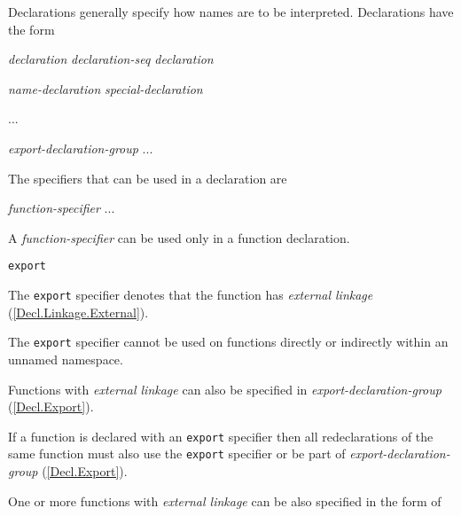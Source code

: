 \p Declarations generally specify how names are to be interpreted. Declarations have the form
\begin{grammar}
  \br
  \textit{declaration}\br
  \textit{declaration-seq declaration}

  \br
  \textit{name-declaration}\br
  \textit{special-declaration}
  
  \br
  ...

  \br
  \textit{export-declaration-group}\br
  ...
\end{grammar}

\p The specifiers that can be used in a declaration are
\begin{grammar}
  \br
  \textit{function-specifier}\br
  ...
\end{grammar}


\p A \textit{function-specifier} can be used only in a function declaration.

\begin{grammar}
  \br
  \texttt{export}\br
\end{grammar}

\p The \texttt{export} specifier denotes that the function has \textit{external linkage} (\ref{Decl.Linkage.External}).

\p The \texttt{export} specifier cannot be used on functions directly or indirectly within an unnamed namespace.

\p Functions with \textit{external linkage} can also be specified in \textit{export-declaration-group} (\ref{Decl.Export}).

\p If a function is declared with an \texttt{export} specifier then all redeclarations of the same function must also use the \texttt{export} specifier or be part of \textit{export-declaration-group} (\ref{Decl.Export}).



\p One or more functions with \textit{external linkage} can be also specified in the form of

